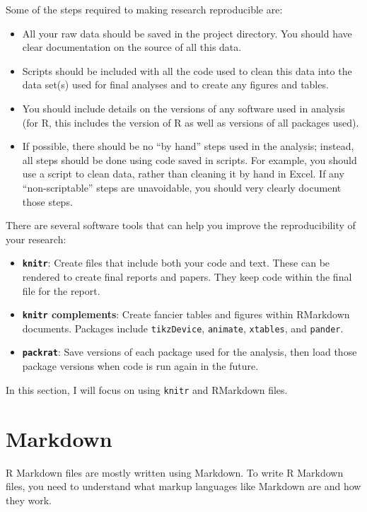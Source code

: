 \documentclass[]{book}
\providecommand{\tightlist}{%
  \setlength{\itemsep}{0pt}\setlength{\parskip}{0pt}}
\theoremstyle{definition}
\theoremstyle{definition}
\theoremstyle{definition}
\theoremstyle{remark}
\begin{document}
Some of the steps required to making research reproducible are:

\begin{itemize}
\tightlist
\item
  All your raw data should be saved in the project directory. You should
  have clear documentation on the source of all this data.
\item
  Scripts should be included with all the code used to clean this data
  into the data set(s) used for final analyses and to create any figures
  and tables.
\item
  You should include details on the versions of any software used in
  analysis (for R, this includes the version of R as well as versions of
  all packages used).
\item
  If possible, there should be no ``by hand'' steps used in the
  analysis; instead, all steps should be done using code saved in
  scripts. For example, you should use a script to clean data, rather
  than cleaning it by hand in Excel. If any ``non-scriptable'' steps are
  unavoidable, you should very clearly document those steps.
\end{itemize}

There are several software tools that can help you improve the
reproducibility of your research:

\begin{itemize}
\tightlist
\item
  \textbf{\texttt{knitr}}: Create files that include both your code and
  text. These can be rendered to create final reports and papers. They
  keep code within the final file for the report.
\item
  \textbf{\texttt{knitr} complements}: Create fancier tables and figures
  within RMarkdown documents. Packages include \texttt{tikzDevice},
  \texttt{animate}, \texttt{xtables}, and \texttt{pander}.
\item
  \textbf{\texttt{packrat}}: Save versions of each package used for the
  analysis, then load those package versions when code is run again in
  the future.
\end{itemize}

In this section, I will focus on using \texttt{knitr} and RMarkdown
files.

\section{Markdown}\label{markdown}

R Markdown files are mostly written using Markdown. To write R Markdown
files, you need to understand what markup languages like Markdown are
and how they work.
\end{document}
